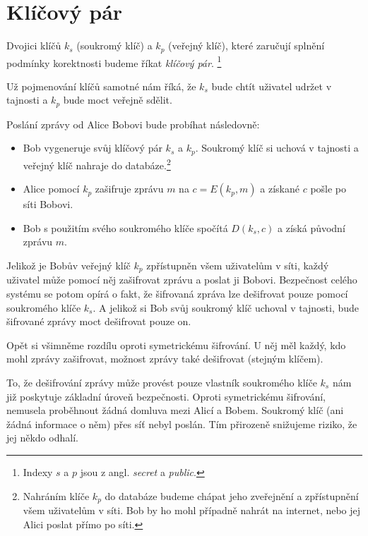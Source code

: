 \documentclass[
  program=infoi,
  biblatex,
  figures=false,
  glossaries,
  index
]{kidiplom}
\begin{document}
\section{Klíčový pár}\label{sec:key-pair}

    Dvojici klíčů $k_s$ (soukromý klíč) a $k_p$ (veřejný klíč), které zaručují splnění podmínky korektnosti budeme říkat \emph{klíčový pár}.
    \footnote{Indexy $s$ a $p$ jsou z angl. \emph{secret} a \emph{public}.}

    Už pojmenování klíčů samotné nám říká, že $k_s$ bude chtít uživatel udržet v tajnosti a $k_p$ bude moct veřejně sdělit.

    \medskip

    Poslání zprávy od Alice Bobovi bude probíhat následovně:

    \begin{itemize}
        \item
            Bob vygeneruje svůj klíčový pár $k_s$ a $k_p$.
            Soukromý klíč si uchová v tajnosti a veřejný klíč nahraje do databáze.\footnote{Nahráním klíče $k_p$ do databáze budeme chápat
            jeho zveřejnění a zpřístupnění všem uživatelům v síti. Bob by ho mohl případně nahrát na internet, nebo jej Alici poslat přímo po síti.}
        \item
            Alice pomocí $k_p$ zašifruje zprávu $m$ na $c=E(k_p, m)$ a získané $c$ pošle po síti Bobovi.
        \item 
            Bob s použitím svého soukromého klíče spočítá $D(k_s, c)$ a získá původní zprávu $m$.
    \end{itemize}

    Jelikož je Bobův veřejný klíč $k_p$ zpřístupněn všem uživatelům v síti, každý uživatel může pomocí něj zašifrovat zprávu a poslat ji Bobovi.
    Bezpečnost celého systému se potom opírá o fakt, že šifrovaná zpráva lze dešifrovat pouze pomocí soukromého klíče $k_s$.
    A jelikož si Bob svůj soukromý klíč uchoval v tajnosti, bude šifrované zprávy moct dešifrovat pouze on.

    \begin{remark}
        Opět si všimněme rozdílu oproti symetrickému šifrování.
        U něj měl každý, kdo mohl zprávy zašifrovat, možnost zprávy také dešifrovat (stejným klíčem).
    \end{remark}

    To, že dešifrování zprávy může provést pouze vlastník soukromého klíče $k_s$ nám již poskytuje základní úroveň bezpečnosti.
    Oproti symetrickému šifrování, nemusela proběhnout žádná domluva mezi Alicí a Bobem.
    Soukromý klíč (ani žádná informace o něm) přes síť nebyl poslán. Tím přirozeně snižujeme riziko, že jej někdo odhalí.
\end{document}
